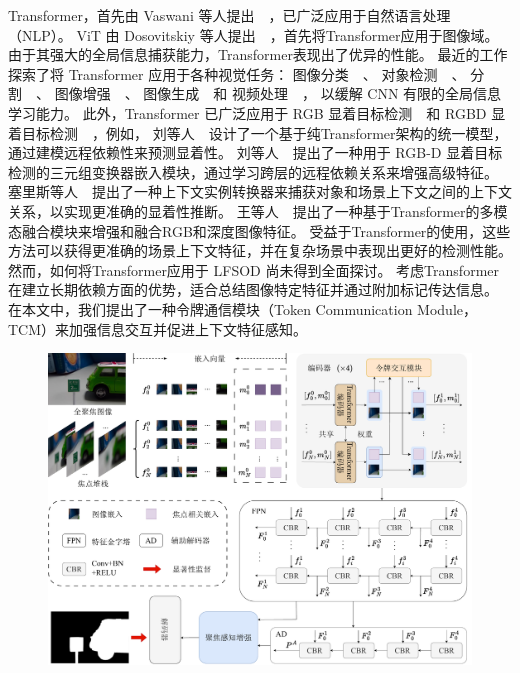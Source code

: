 Transformer，首先由 Vaswani 等人提出~\cite{vaswani2017attention}~，已广泛应用于自然语言处理（NLP）。
ViT 由 Dosovitskiy 等人提出~\cite{dosovitskiy2020image}~，首先将Transformer应用于图像域。 由于其强大的全局信息捕获能力，Transformer表现出了优异的性能。
最近的工作探索了将 Transformer 应用于各种视觉任务：
图像分类~\cite{chen2020generative, dosovitskiy2020image}~、
对象检测~\cite{zhu2020deformable, dai2021up, sun2021rethinking}~、
分割~\cite{chen2021pre, wang2021end}~、
图像增强~\cite{yang2020learning, chen2021pre}~、
图像生成~\cite{parmar2018image}~和 
视频处理~\cite{zhou2018end, zheng2020end}~，
以缓解 CNN 有限的全局信息学习能力。 此外，Transformer 已广泛应用于 RGB 显着目标检测~\cite{liu2021visual, siris2021scene}~和 RGBD 显着目标检测~\cite{liu2021tritransnet, wang2021mutualformer}~，例如，
刘等人~\cite{liu2021visual}~设计了一个基于纯Transformer架构的统一模型，通过建模远程依赖性来预测显着性。 
刘等人~\cite{liu2021tritransnet}~提出了一种用于 RGB-D 显着目标检测的三元组变换器嵌入模块，通过学习跨层的远程依赖关系来增强高级特征。 
塞里斯等人~\cite{siris2021scene}~提出了一种上下文实例转换器来捕获对象和场景上下文之间的上下文关系，以实现更准确的显着性推断。 
王等人~\cite{wang2021mutualformer}~提出了一种基于Transformer的多模态融合模块来增强和融合RGB和深度图像特征。
受益于Transformer的使用，这些方法可以获得更准确的场景上下文特征，并在复杂场景中表现出更好的检测性能。 然而，如何将Transformer应用于 LFSOD 尚未得到全面探讨。 考虑Transformer在建立长期依赖方面的优势，适合总结图像特定特征并通过附加标记传达信息。 在本文中，我们提出了一种令牌通信模块（Token Communication
Module，TCM）来加强信息交互并促进上下文特征感知。
%
%
%
%
%
%
%
%
\begin{figure}[!ht]
	\centering
	\includegraphics[width=0.95\linewidth]{figures/chapter3/overview_1}
	\label{cpt3_fig1:overview}
\end{figure}
